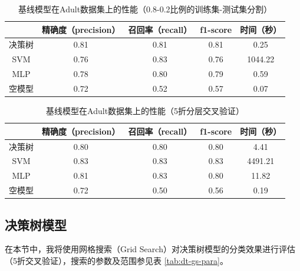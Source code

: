 \documentclass[12pt,a4paper]{article}
\theoremstyle{definition}
\begin{document}
\begin{table}[H]
	\renewcommand\arraystretch{1.35}
	\caption{基线模型在Adult数据集上的性能（0.8-0.2比例的训练集-测试集分割）}
	\label{tab:baselines1}
	\centering
	
	\begin{tabular}{c|c|c|c|c}
		\centering
		 & 精确度（precision） & 召回率（recall） & f1-score & 时间（秒） \\
		\hline
		\hline
		
		决策树 & 0.81 & 0.81 & 0.81 & 0.25 \\
		SVM & 0.76 & 0.83 & 0.76 & 1044.22 \\
		MLP & 0.78 & 0.80 & 0.79 & 0.59 \\
		空模型 & 0.72 & 0.52 & 0.57 & 0.07 \\

	\end{tabular}
\end{table}

\begin{table}[H]
	\renewcommand\arraystretch{1.35}
	\caption{基线模型在Adult数据集上的性能（5折分层交叉验证）}
	\label{tab:baselines2}
	\centering
	
	\begin{tabular}{c|c|c|c|c}
		\centering
		 & 精确度（precision） & 召回率（recall） & f1-score & 时间（秒） \\
		\hline
		\hline
		
		决策树 & 0.80 & 0.80 & 0.80 & 4.41 \\
		SVM & 0.83 & 0.83 & 0.83 & 4491.21 \\
		MLP & 0.81 & 0.83 & 0.80 & 11.82 \\
		空模型 & 0.72 & 0.50 & 0.56 & 0.19 \\

	\end{tabular}
\end{table}

\subsection{决策树模型}

在本节中，我将使用网格搜索（Grid Search）对决策树模型的分类效果进行评估（5折交叉验证），搜索的参数及范围参见表 \ref{tab:dt-gs-para}。
\end{document}

